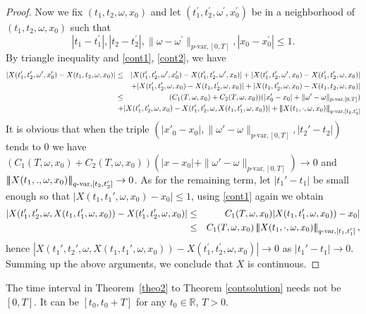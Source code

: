 \documentclass[10pt]{article}
\numberwithin{equation}{section} %
\newcommand{\R}{\ensuremath{\mathbb{R}}}
\newcommand{\ltn}{\ensuremath{\left| \! \left| \! \left|}}
\newcommand{\rtn}{\ensuremath{\right| \! \right| \! \right|}}
\begin{document}
\begin{proof}
Now we fix $(t_1,t_2,\omega,x_0)$ and let $(t_1^\prime,t_2^\prime,\omega^\prime,x_0^\prime)$ be in a neighborhood of $(t_1,t_2,\omega,x_0)$  such that 
$$
|t_1-t_1^\prime|, |t_2-t_2^\prime|, \|\omega-\omega^\prime\|_{p\text{-var},[0,T]}, |x_0-x_0^\prime|\leq 1.
$$
By triangle inequality and \eqref{cont1}, \eqref{cont2}, we have
\begin{eqnarray*}
|X(t_1^\prime, t_2^\prime,\omega^\prime,x_0^\prime) - X(t_1,t_2,\omega,x_0)|&\leq & |X(t_1^\prime,t_2^\prime,\omega^\prime,x_0^\prime) - X(t_1^\prime,t_2^\prime,\omega',x_0)|+ |X(t_1^\prime,t_2^\prime,\omega^\prime,x_0) - X(t_1^\prime,t_2^\prime,\omega,x_0)|\\
&&+|X(t_1^\prime,t_2^\prime,\omega,x_0) - X(t_1,t_2',\omega,x_0)|+ |X(t_1,t_2',\omega,x_0)-X(t_1,t_2,\omega,x_0)|\\
&\leq & (C_1(T,\omega,x_0) + C_2(T,\omega,x_0))(|x'_0-x_0|+\|\omega'-\omega\|_{p\text{-var},[0,T]})\\
&&\hspace*{-2cm}+ |X(t_1',t_2',\omega,x_0)- X(t_1^\prime,t_2^\prime,\omega,X(t_1,t_1',\omega,x_0))| + \ltn X(t_1,\cdot,\omega,x_0)\rtn_{q\text{-var},[t_2,t_2']}
\end{eqnarray*} 
It is obvious that when the triple $(|x'_0-x_0|,\|\omega'-\omega\|_{p\text{-var},[0,T]}, |t_2'-t_2|)$ tends to 0 we have 
  $(C_1(T,\omega,x_0) + C_2(T,\omega,x_0))(|x-x_0|+\|\omega'-\omega\|_{p\text{-var},[0,T]})\to 0$ and $\ltn X(t_1,.,\omega,x_0)\rtn_{q\text{-var},[t_2,t_2']}\to 0$. 
As for the remaining term, let $|t_1'-t_1|$ be small enough so that $|X(t_1,t_1',\omega,x_0)-x_0|\leq 1$, using \eqref{cont1} again we obtain
\begin{eqnarray*}
 |X(t_1',t_2',\omega,X(t_1,t_1',\omega,x_0))- X(t_1^\prime,t_2^\prime,\omega,x_0)|&\leq & C_1(T,\omega,x_0) |X(t_1,t_1',\omega,x_0))-x_0|\\
&\leq & C_1(T,\omega,x_0)\ltn X(t_1,\cdot, \omega,x_0)\rtn_{q\text{-var},[t_1,t_1']},
\end{eqnarray*}
hence $ |X(t_1',t_2',\omega,X(t_1,t_1',\omega,x_0))- X(t_1^\prime,t_2^\prime,\omega,x_0)| \to 0$ as $|t_1'-t_1|\to 0$. Summing up the above arguments, we conclude that $X$ is continuous.
\end{proof}
\begin{remark}
 The time interval in Theorem~\ref{theo2} to Theorem \ref{contsolution} needs not be $[0,T]$. It can be $[t_0,t_0+T]$ for any $t_0\in\R$, $T>0$.
\end{remark}
\end{document}
